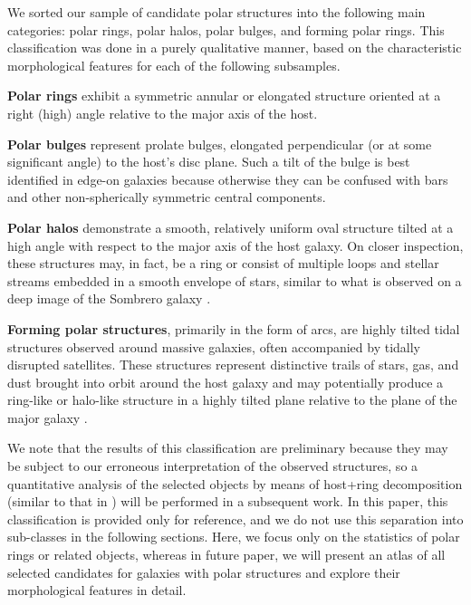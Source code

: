 \documentclass[letter]{aa}
\begin{document}
We sorted our sample of candidate polar structures into the following main categories: polar rings, polar halos, polar bulges, and forming polar rings. This classification was done in a purely qualitative manner, based on the characteristic morphological features for each of the following subsamples.

\textbf{Polar rings} exhibit a symmetric annular or elongated structure oriented at a right (high) angle relative to the major axis of the host.

\textbf{Polar bulges} represent prolate bulges, elongated perpendicular (or at some significant angle) to the host's disc plane. Such a tilt of the bulge is best identified in edge-on galaxies \citep{2015AstL...41..748R} because otherwise they can be confused with bars and other non-spherically symmetric central components.

\textbf{Polar halos} demonstrate a smooth, relatively uniform oval structure tilted at a high angle with respect to the major axis of the host galaxy. On closer inspection, these structures may, in fact, be a ring or consist of multiple loops and stellar streams embedded in a smooth envelope of stars, similar to what is observed on a deep image of the Sombrero galaxy \citep{2021MNRAS.506.5030M}.

\textbf{Forming polar structures}, primarily in the form of arcs, are highly tilted tidal structures observed around massive galaxies, often accompanied by tidally disrupted satellites. These structures represent distinctive trails of stars, gas, and dust brought into orbit around the host galaxy and may potentially produce a ring-like or halo-like structure in a highly tilted plane relative to the plane of the major galaxy \citep[see examples in][]{mosenkov2022unveiling}.

We note that the results of this classification are preliminary because they may be subject to our erroneous interpretation of the observed structures, so a quantitative analysis of the selected objects by means of host+ring decomposition (similar to that in \citealt{mosenkov2022unveiling}) will be performed in a subsequent work. In this paper, this classification is provided only for reference, and we do not use this separation into sub-classes in the following sections. 
Here, we focus only on the statistics of polar rings or related objects, whereas in future paper, we will present an atlas of all selected candidates for galaxies with polar structures and explore their morphological features in detail.
\end{document}
